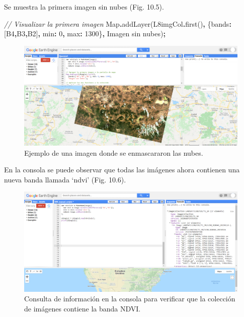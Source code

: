 \documentclass[
  12pt,
  letterpaper,
  twoside]{book}
\newenvironment{Shaded}{\begin{snugshade}}{\end{snugshade}}
\newcommand{\BuiltInTok}[1]{#1}
\newcommand{\CommentTok}[1]{\textcolor[rgb]{0.56,0.35,0.01}{\textit{#1}}}
\newcommand{\DataTypeTok}[1]{\textcolor[rgb]{0.13,0.29,0.53}{#1}}
\newcommand{\DecValTok}[1]{\textcolor[rgb]{0.00,0.00,0.81}{#1}}
\newcommand{\FunctionTok}[1]{\textcolor[rgb]{0.00,0.00,0.00}{#1}}
\newcommand{\NormalTok}[1]{#1}
\newcommand{\OperatorTok}[1]{\textcolor[rgb]{0.81,0.36,0.00}{\textbf{#1}}}
\newcommand{\StringTok}[1]{\textcolor[rgb]{0.31,0.60,0.02}{#1}}
\begin{document}
Se muestra la primera imagen sin nubes (Fig. 10.5).

\begin{Shaded}
\begin{Highlighting}[]
\CommentTok{// Visualizar la primera imagen}
\BuiltInTok{Map}\OperatorTok{.}\FunctionTok{addLayer}\NormalTok{(L8imgCol}\OperatorTok{.}\FunctionTok{first}\NormalTok{()}\OperatorTok{,} 
\NormalTok{  \{}\DataTypeTok{bands}\OperatorTok{:}\NormalTok{[}\StringTok{\textquotesingle{}B4\textquotesingle{}}\OperatorTok{,}\StringTok{\textquotesingle{}B3\textquotesingle{}}\OperatorTok{,}\StringTok{\textquotesingle{}B2\textquotesingle{}}\NormalTok{]}\OperatorTok{,} \DataTypeTok{min}\OperatorTok{:} \DecValTok{0}\OperatorTok{,} \DataTypeTok{max}\OperatorTok{:} \DecValTok{1300}\NormalTok{\}}\OperatorTok{,}
  \StringTok{\textquotesingle{}Imagen sin nubes\textquotesingle{}}\NormalTok{)}\OperatorTok{;}
\end{Highlighting}
\end{Shaded}

\begin{figure}[btp]

{\centering \includegraphics[width=1\linewidth]{Img/imSinNubes} 

}

\caption{Ejemplo de una imagen donde se enmascararon las nubes.}\label{fig:unnamed-chunk-168}
\end{figure}

En la consola se puede observar que todas las imágenes ahora contienen una nueva banda llamada `ndvi' (Fig. 10.6).

\begin{figure}[btp]

{\centering \includegraphics[width=1\linewidth]{Img/imConNDVI} 

}

\caption{Consulta de información en la consola para verificar que la colección de imágenes contiene la banda NDVI.}\label{fig:unnamed-chunk-169}
\end{figure}
\end{document}
